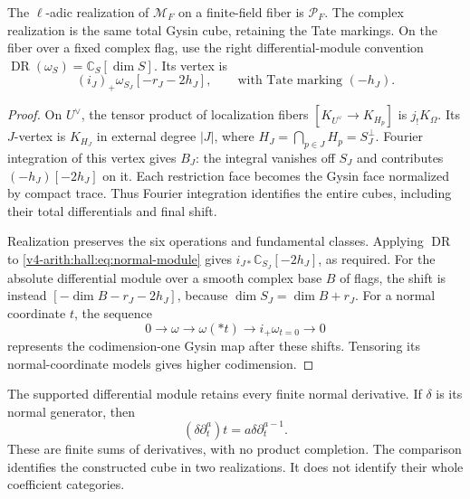 \begin{proposition}\label{v4-arith:hall:prop:realizations}
The $\ell$-adic realization of $\mathcal M_F$ on a finite-field
fiber is $\mathcal P_F$.
The complex realization is the same total Gysin cube, retaining
the Tate markings. On the fiber over a fixed complex flag, use
the right differential-module convention
$\operatorname{DR}(\omega_S)=\mathbb C_S[\dim S]$. Its vertex is
\begin{equation}\label{v4-arith:hall:eq:normal-module}
 (i_J)_+\omega_{S_J}[-r_J-2h_J],
 \qquad\text{with Tate marking }(-h_J).
\end{equation}
\end{proposition}
\begin{proof}
On $U^\vee$, the tensor product of localization fibers
$[K_{U^\vee}\to K_{H_p}]$ is $j_!K_\Omega$.
Its $J$-vertex is $K_{H_J}$ in external degree $|J|$, where
$H_J=\bigcap_{p\in J}H_p=S_J^\perp$.
Fourier integration of this vertex gives $B_J$: the integral
vanishes off $S_J$ and contributes $(-h_J)[-2h_J]$ on it.
Each restriction face becomes the Gysin face normalized by compact
trace. Thus Fourier integration identifies the entire cubes,
including their total differentials and final shift.

Realization preserves the six operations and fundamental classes.
Applying $\operatorname{DR}$ to
\eqref{v4-arith:hall:eq:normal-module} gives
$i_{J*}\mathbb C_{S_J}[-2h_J]$, as required.
For the absolute differential module over a smooth complex base
$B$ of flags, the shift is instead $[-\dim B-r_J-2h_J]$,
because $\dim S_J=\dim B+r_J$.
For a normal coordinate $t$, the sequence
\[
 0\longrightarrow\omega\longrightarrow\omega(*t)
   \longrightarrow i_+\omega_{t=0}\longrightarrow0
\]
represents the codimension-one Gysin map after these shifts.
Tensoring its normal-coordinate models gives higher codimension.
\end{proof}

The supported differential module retains every finite normal
derivative. If $\delta$ is its normal generator, then
\[
 (\delta\partial_t^a)t=a\delta\partial_t^{a-1}.
\]
These are finite sums of derivatives, with no product completion.
The comparison identifies the constructed cube in two realizations.
It does not identify their whole coefficient categories.

